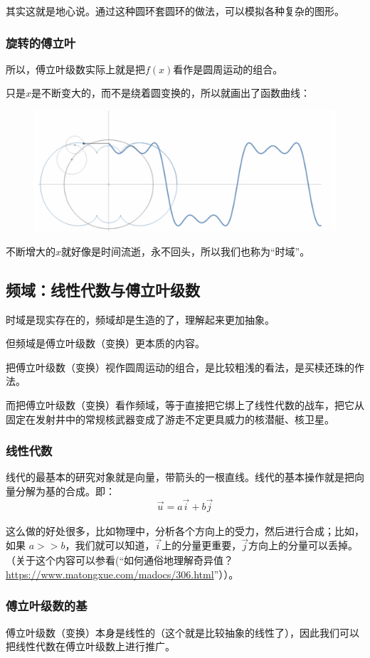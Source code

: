 \documentclass[12pt]{article}
\begin{document}
其实这就是地心说。通过这种圆环套圆环的做法，可以模拟各种复杂的图形。

\subsubsection{旋转的傅立叶}
所以，傅立叶级数实际上就是把$f(x)$看作是圆周运动的组合。

只是$x$是不断变大的，而不是绕着圆变换的，所以就画出了函数曲线：
\begin{figure}[H]
  \centering
  \includegraphics[width=.8\textwidth]{fig/ft_curve.png} 
\end{figure}

不断增大的$x$就好像是时间流逝，永不回头，所以我们也称为“时域”。

\subsection{频域：线性代数与傅立叶级数}
时域是现实存在的，频域却是生造的了，理解起来更加抽象。

但频域是傅立叶级数（变换）更本质的内容。

把傅立叶级数（变换）视作圆周运动的组合，是比较粗浅的看法，是买椟还珠的作法。

而把傅立叶级数（变换）看作频域，等于直接把它绑上了线性代数的战车，把它从固定在发射井中的常规核武器变成了游走不定更具威力的核潜艇、核卫星。

\subsubsection{线性代数}
线代的最基本的研究对象就是向量，带箭头的一根直线。线代的基本操作就是把向量分解为基的合成。即：
$$
\vec{u_{}}=a\vec{i_{}}+b\vec{j_{}}
$$

这么做的好处很多，比如物理中，分析各个方向上的受力，然后进行合成；比如，如果 $a >> b$，我们就可以知道，$\vec{i_{}}$上的分量更重要，$\vec{j_{}}$方向上的分量可以丢掉。（关于这个内容可以参看(“如何通俗地理解奇异值？\url{https://www.matongxue.com/madocs/306.html}”））。

\subsubsection{傅立叶级数的基}
傅立叶级数（变换）本身是线性的（这个就是比较抽象的线性了），因此我们可以把线性代数在傅立叶级数上进行推广。
\end{document}
